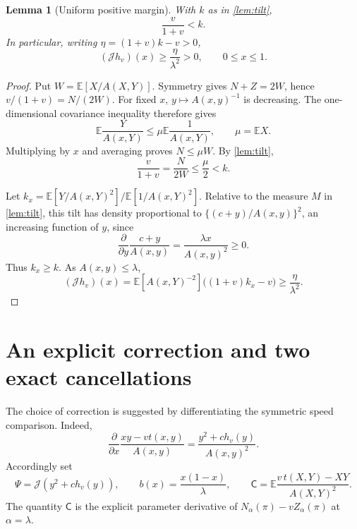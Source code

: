 \documentclass[11pt,a4paper]{article}
\numberwithin{equation}{section}
\theoremstyle{notethm}
\newtheorem{lemma}[lemma]{Lemma}
\theoremstyle{definition}
\newcommand{\E}{\mathbb E}
\newcommand{\cJ}{\mathcal J}
\begin{document}
\begin{lemma}[Uniform positive margin]\label{lem:positive-kernel}
With $k$ as in \cref{lem:tilt},
\begin{equation}\label{eq:threshold-k}
 \frac{v}{1+v}<k.
\end{equation}
In particular, writing $\eta=(1+v)k-v>0$,
\begin{equation}\label{eq:J-positive}
 (\cJ h_v)(x)\ge\frac{\eta}{\lambda^2}>0,
 \qquad 0\le x\le1.
\end{equation}
\end{lemma}

\begin{proof}
Put $W=\E[X/A(X,Y)]$. Symmetry gives $N+Z=2W$, hence
$v/(1+v)=N/(2W)$. For fixed $x$, $y\mapsto A(x,y)^{-1}$ is decreasing.
The one-dimensional covariance inequality therefore gives
\[
 \E\frac{Y}{A(x,Y)}\le\mu\E\frac1{A(x,Y)},\qquad \mu=\E X.
\]
Multiplying by $x$ and averaging proves $N\le\mu W$. By \cref{lem:tilt},
\begin{equation}\label{eq:v-mu-k}
 \frac{v}{1+v}=\frac N{2W}\le\frac\mu2<k.
\end{equation}

Let $k_x=\E[Y/A(x,Y)^2]/\E[1/A(x,Y)^2]$. Relative to the measure $M$ in
\cref{lem:tilt}, this tilt has density proportional to
$\{(c+y)/A(x,y)\}^2$, an increasing function of $y$, since
\begin{equation}\label{eq:ratio-derivative}
 \frac{\partial}{\partial y}\frac{c+y}{A(x,y)}
 =\frac{\lambda x}{A(x,y)^2}\ge0.
\end{equation}
Thus $k_x\ge k$. As $A(x,y)\le\lambda$,
\[
 (\cJ h_v)(x)
 =\E[A(x,Y)^{-2}]\bigl((1+v)k_x-v\bigr)
 \ge\frac{\eta}{\lambda^2}.
\]
\end{proof}

\section{An explicit correction and two exact cancellations}\label{sec:correction}

The choice of correction is suggested by differentiating the symmetric
speed comparison. Indeed,
\begin{equation}\label{eq:variation-kernel}
 \frac{\partial}{\partial x}
       \frac{xy-vt(x,y)}{A(x,y)}
 =\frac{y^2+c h_v(y)}{A(x,y)^2}.
\end{equation}
Accordingly set
\begin{equation}\label{eq:Psi}
 \Psi=\cJ(y^2+c h_v(y)),\qquad
 b(x)=\frac{x(1-x)}{\lambda},\qquad
 \mathsf C=\E\frac{v\,t(X,Y)-XY}{A(X,Y)^2}.
\end{equation}
The quantity $\mathsf C$ is the explicit parameter derivative of
$N_\alpha(\pi)-vZ_\alpha(\pi)$ at $\alpha=\lambda$.
\end{document}
